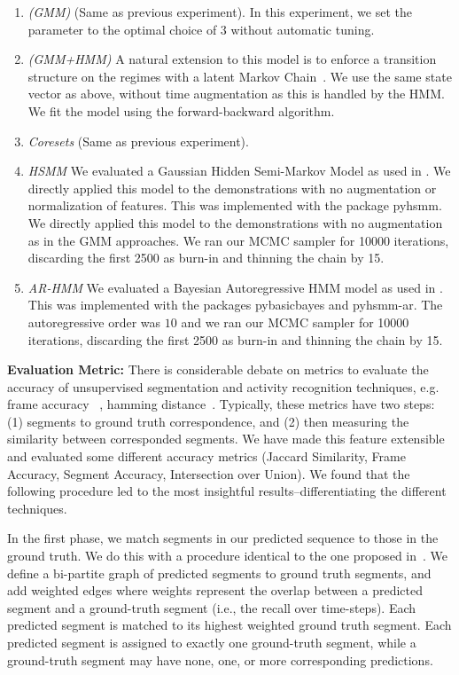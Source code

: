 \begin{enumerate}
    \item \emph{(GMM)} (Same as previous experiment). In this experiment, we set the parameter to the optimal choice of $3$ without automatic tuning.
    \item \emph{(GMM+HMM)} A natural extension to this model is to enforce a transition structure on the regimes with a latent Markov Chain~\cite{asfour2006imitation,calinon2004stochastic,kruger2010learning, vakanski2012trajectory}. 
    We use the same state vector as above, without time augmentation as this is handled by the HMM. We fit the model using the forward-backward algorithm.
    \item \emph{Coresets} (Same as previous experiment).
    \item \emph{HSMM} We evaluated a Gaussian Hidden Semi-Markov Model as used in \cite{tanwani2016learning}. We directly applied this model to the demonstrations with no augmentation or normalization of features. This was implemented with the package \textsf{pyhsmm}. We directly applied this model to the demonstrations with no augmentation as in the GMM approaches. We ran our MCMC sampler for 10000 iterations, discarding the first 2500 as burn-in and thinning the chain by 15. 
    \item \emph{AR-HMM} We evaluated a Bayesian Autoregressive HMM model as used in \cite{niekum2012learning}. This was implemented with the packages \textsf{pybasicbayes} and \textsf{pyhsmm-ar}. The autoregressive order was $10$ and we ran our MCMC sampler for 10000 iterations, discarding the first 2500 as burn-in and thinning the chain by 15. 
\end{enumerate}

\vspace{0.5em}
\noindent\textbf{Evaluation Metric: } There is considerable debate on metrics to evaluate the accuracy of unsupervised segmentation and activity recognition techniques, e.g. frame accuracy ~\citep{wu2015watch}, hamming distance~\citep{fox2009sharing}. Typically, these metrics have two steps: (1) segments to ground truth correspondence, and (2) then measuring the similarity between corresponded segments. We have made this feature extensible and evaluated some different accuracy metrics (Jaccard Similarity, Frame Accuracy, Segment Accuracy, Intersection over Union). We found that the following procedure led to the most insightful results--differentiating the different techniques.

In the first phase, we match segments in our predicted sequence to those in the ground truth. We do this with a procedure identical to the one proposed in~\cite{wu2015watch}. We define a bi-partite graph of predicted segments to ground truth segments, and add weighted edges where weights represent the overlap between a predicted segment and a ground-truth segment (i.e., the recall over time-steps). Each predicted segment is matched to its highest weighted ground truth segment. Each predicted segment is assigned to exactly one ground-truth segment, while a ground-truth segment may have none, one, or more corresponding predictions.

